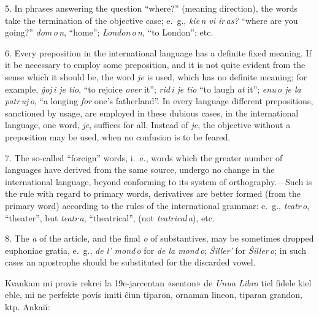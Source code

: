 \documentclass[12pt,twoside]{book}
\begin{document}
5. In phrases answering the question “where?” (meaning direction), the words take the termination of the objective case; e.~g., \emph{kie\,n vi ir\,as?} “where are you going?” \emph{dom\,o\,n}, “home”; \emph{London\,o\,n}, “to London”; etc.

6. Every preposition in the international language has a definite fixed meaning. If it be necessary to employ some preposition, and it is not quite evident from the sense which it should be, the word \emph{je} is used, which has no definite meaning; for example, \emph{ĝoj\,i je tio}, “to rejoice \emph{over} it”; \emph{rid\,i je tio} “to laugh \emph{at} it”; \emph{enu\,o je la patr\,uj\,o}, “a longing \emph{for} one’s fatherland”. In every language different prepositions, sanctioned by usage, are employed in these dubious cases, in the international language, one word, \emph{je}, suffices for all. Instead of \emph{je}, the objective without a preposition may be used, when no confusion is to be feared.

7. The so-called “foreign” words, i.~e., words which the greater number of languages have derived from the same source, undergo no change in the international language, beyond conforming to its system of orthography.---Such is the rule with regard to primary words, derivatives are better formed (from the primary word) according to the rules of the international grammar: e.~g., \emph{teatr\,o}, “theater”, but \emph{teatr\,a}, “theatrical”, (not \emph{teatrical\,a}), etc.

8. The \emph{a} of the article, and the final \emph{o} of substantives, may be sometimes dropped euphoniae gratia, e.~g., \emph{de l’ mond\,o} for \emph{de la mond\,o}; \emph{Ŝiller’} for \emph{Ŝiller\,o}; in such cases an apostrophe should be substituted for the discarded vowel. 

\sectionline

%
%


%
%
\kolofono

\small Kvankam mi provis rekrei la 19e-jarcentan «senton» de \emph{Unua Libro} tiel fidele kiel eble, mi ne perfekte povis imiti ĉiun tiparon, ornaman lineon, tiparan grandon, ktp.  Ankaŭ:
\end{document}
